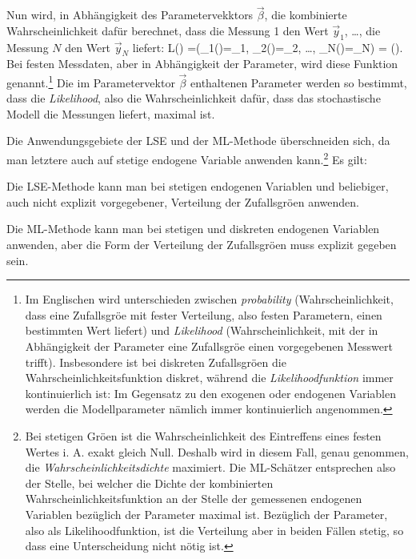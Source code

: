 Nun wird, in Abh\"angigkeit des Parametervekktors
$\vec{\beta}$, die kombinierte Wahrscheinlichkeit daf\"ur berechnet, dass
die Messung 1 den Wert $\vec{y}_1$, \ldots, die Messung $N$ den Wert $\vec{y}_N$
liefert:
\be
\label{ML-allg}
L(\vec{\beta})
=(\!_1(\vecbeta)=_1, \!_2(\vecbeta)=_2, \ldots,
\!_N(\vecbeta)=_N) = (\vecbeta). 
\ee
Bei festen Messdaten, aber in  Abh\"angigkeit der Parameter, wird
diese Funktion  genannt.\footnote{Im
  Englischen wird unterschieden zwischen \emph{probability}
  (Wahrscheinlichkeit, 
  dass eine Zufallsgr\"o\3e mit fester Verteilung, also festen
  Parametern, einen bestimmten Wert liefert) und
  \emph{Likelihood} (Wahrscheinlichkeit, mit der in Abh\"angigkeit der
  Parameter eine Zufallsgr\"o\3e einen vorgegebenen Messwert
  trifft). Insbesondere ist bei diskreten Zufallsgr\"o\3en die 
  Wahrscheinlichkeitsfunktion diskret, w\"ahrend die
  \emph{Likelihoodfunktion} immer kontinuierlich ist: Im Gegensatz zu den
  exogenen oder endogenen Variablen werden die Modellparameter
  n\"amlich immer kontinuierlich angenommen.}
 Die im Parametervektor $\vec{\beta}$ enthaltenen Parameter
werden so bestimmt, dass die
\emph{Likelihood}, also die 
Wahrscheinlichkeit daf\"ur, dass das stochastische Modell die Messungen
liefert, maximal ist.

Die Anwendungsgebiete der LSE und der ML-Methode \"uberschneiden sich,
da man letztere auch auf stetige endogene Variable anwenden 
kann.\footnote{Bei stetigen Gr\"o\3en ist die
Wahrscheinlichkeit des Eintreffens eines festen Wertes 
i. A. exakt gleich Null. Deshalb wird in diesem Fall, genau genommen, die
\emph{Wahrscheinlichkeitsdichte} maximiert. Die ML-Sch\"atzer
entsprechen also 
der Stelle, bei welcher die Dichte der kombinierten
Wahrscheinlichkeitsfunktion an der Stelle der gemessenen endogenen
Variablen bez\"uglich der Parameter maximal ist. Bez\"uglich der
Parameter, also als Likelihoodfunktion, ist die Verteilung aber in
beiden F\"allen stetig, so dass eine Unterscheidung nicht n\"otig ist.}
Es gilt:
\bi
\item Die LSE-Methode kann man bei stetigen endogenen Variablen und
beliebiger, auch nicht explizit vorgegebener, Verteilung der
Zufallsgr\"o\3en anwenden.
\item Die ML-Methode kann man bei stetigen und diskreten endogenen
Variablen anwenden, aber die Form der Verteilung der Zufallsgr\"o\3en
muss explizit gegeben sein.
\ei

